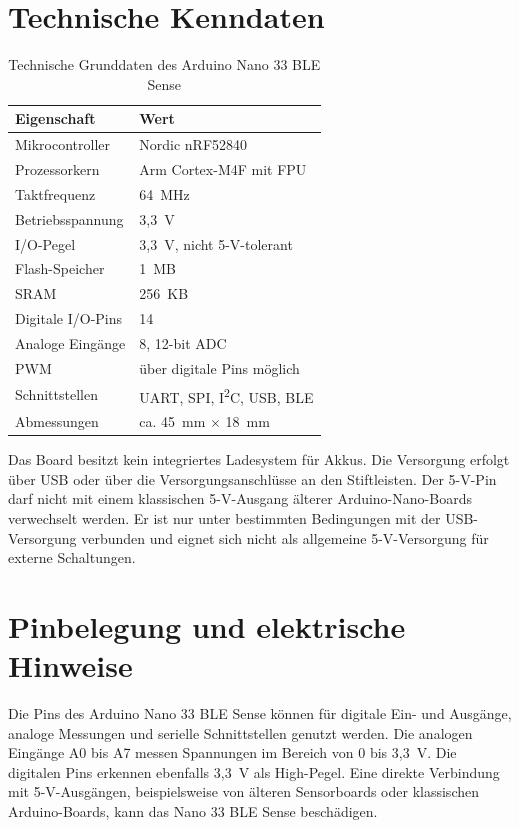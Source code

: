 \section{Technische Kenndaten}

\begin{table}[h]
	\centering
	\begin{tabular}{ll}
		\textbf{Eigenschaft} & \textbf{Wert} \\
		\hline
		Mikrocontroller & Nordic nRF52840 \\
		Prozessorkern & Arm Cortex-M4F mit FPU \\
		Taktfrequenz & 64~MHz \\
		Betriebsspannung & 3,3~V \\
		I/O-Pegel & 3,3~V, nicht 5-V-tolerant \\
		Flash-Speicher & 1~MB \\
		SRAM & 256~KB \\
		Digitale I/O-Pins & 14 \\
		Analoge Eingänge & 8, 12-bit ADC \\
		PWM & über digitale Pins möglich \\
		Schnittstellen & UART, SPI, I\textsuperscript{2}C, USB, BLE \\
		Abmessungen & ca. 45~mm $\times$ 18~mm \\
	\end{tabular}
	\caption{Technische Grunddaten des Arduino Nano 33 BLE Sense}
	\label{tab:Nano33BLEGrunddaten}
\end{table}

Das Board besitzt kein integriertes Ladesystem für Akkus. Die Versorgung erfolgt über USB oder über die Versorgungsanschlüsse an den Stiftleisten. Der 5-V-Pin darf nicht mit einem klassischen 5-V-Ausgang älterer Arduino-Nano-Boards verwechselt werden. Er ist nur unter bestimmten Bedingungen mit der USB-Versorgung verbunden und eignet sich nicht als allgemeine 5-V-Versorgung für externe Schaltungen.

\section{Pinbelegung und elektrische Hinweise}

Die Pins des Arduino Nano 33 BLE Sense können für digitale Ein- und Ausgänge, analoge Messungen und serielle Schnittstellen genutzt werden. Die analogen Eingänge A0 bis A7 messen Spannungen im Bereich von 0 bis 3,3~V. Die digitalen Pins erkennen ebenfalls 3,3~V als High-Pegel. Eine direkte Verbindung mit 5-V-Ausgängen, beispielsweise von älteren Sensorboards oder klassischen Arduino-Boards, kann das Nano 33 BLE Sense beschädigen.

